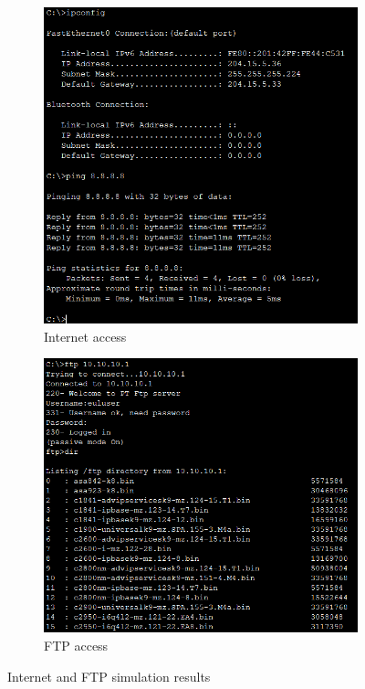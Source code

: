 \documentclass[ a4, 12pt, onecolumn]{IEEEtran}
\begin{document}
\begin{figure}[H]
  \begin{subfigure}[b]{0.4\textwidth}
    \includegraphics[width=\textwidth]{internet.png}
    \caption{Internet access}
\label{fig:test3}  
  \end{subfigure}
  \hfill
  \begin{subfigure}[b]{0.4\textwidth}
    \includegraphics[width=\textwidth]{ftp.png}
    \caption{FTP access}
\label{fig:test4}  
  \end{subfigure}
  \caption{Internet and FTP simulation results}
\end{figure}
\end{document}
